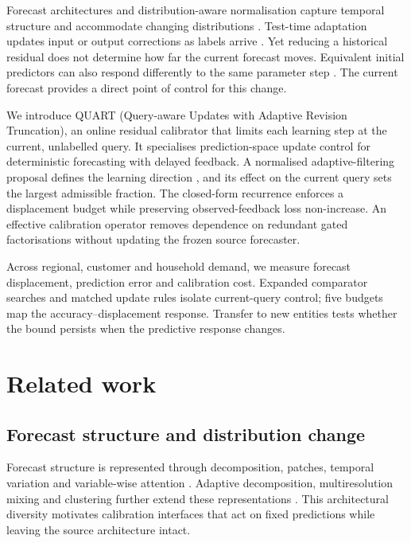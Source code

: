 \documentclass[preprint,12pt,times,nonatbib]{elsarticle}
\begin{document}
Forecast architectures and distribution-aware normalisation capture temporal structure and accommodate changing distributions \parencite{zeng2023transformers,nie2023patchtst,liu2022nonstationary,fan2023dishts,chen2024calibration}. Test-time adaptation updates input or output corrections as labels arrive \parencite{kim2025tta,im2026cosa}. Yet reducing a historical residual does not determine how far the current forecast moves. Equivalent initial predictors can also respond differently to the same parameter step \parencite{amari1998}. The current forecast provides a direct point of control for this change.

We introduce QUART (Query-aware Updates with Adaptive Revision Truncation), an online residual calibrator that limits each learning step at the current, unlabelled query. It specialises prediction-space update control \parencite{schulman2015trpo} for deterministic forecasting with delayed feedback. A normalised adaptive-filtering proposal defines the learning direction \parencite{nagumo1967}, and its effect on the current query sets the largest admissible fraction. The closed-form recurrence enforces a displacement budget while preserving observed-feedback loss non-increase. An effective calibration operator removes dependence on redundant gated factorisations without updating the frozen source forecaster.

Across regional, customer and household demand, we measure forecast displacement, prediction error and calibration cost. Expanded comparator searches and matched update rules isolate current-query control; five budgets map the accuracy--displacement response. Transfer to new entities tests whether the bound persists when the predictive response changes.

\section{Related work}
\subsection{Forecast structure and distribution change}
Forecast structure is represented through decomposition, patches, temporal variation and variable-wise attention \parencite{zeng2023transformers,nie2023patchtst,wu2023timesnet,liu2023itransformer}. Adaptive decomposition, multiresolution mixing and clustering further extend these representations \parencite{hu2025adaptive,murad2025wpmixer,qiu2025duet}. This architectural diversity motivates calibration interfaces that act on fixed predictions while leaving the source architecture intact.
\end{document}
